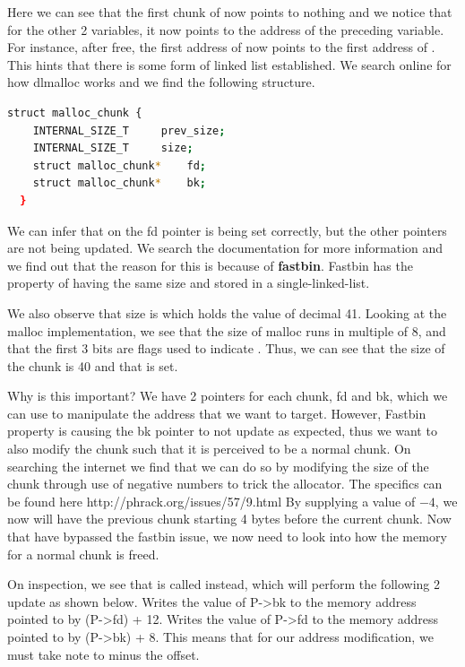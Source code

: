 Here we can see that the first chunk of  now points to nothing and we notice
that for the other 2 variables, it now points to the address of the preceding
variable. For instance, after free, the first address of  now points to
the first address of . This hints that there is some form of linked list
established. We search online for how dlmalloc works and we find the following
structure.

\begin{lstlisting}[language=bash]
  struct malloc_chunk {
    INTERNAL_SIZE_T		prev_size;
    INTERNAL_SIZE_T		size;
    struct malloc_chunk*	fd;
    struct malloc_chunk*	bk;
  }
\end{lstlisting}

We can infer that on  the fd pointer is being set correctly, but
the other pointers are not being updated. We search the documentation for more
information and we find out that the reason for this is because of \textbf{fastbin}.
Fastbin has the property of having the same size and stored in a single-linked-list.

We also observe that size is  which holds the value of decimal
41. Looking at the malloc implementation, we see that the size of malloc runs
in multiple of 8, and that the first 3 bits are flags used to indicate
. Thus, we can see that the
size of the chunk is 40 and that  is set.

Why is this important? We have 2 pointers for each chunk, fd and bk, which we
can use to manipulate the address that we want to target. However, Fastbin property
is causing the bk pointer to not update as expected, thus we want to also modify
the chunk such that it is perceived to be a normal chunk. On searching the internet
we find that we can do so by modifying the size of the chunk through use of negative
numbers to trick the allocator. The specifics can be found here http://phrack.org/issues/57/9.html
By supplying a value of $-4$, we now will have the previous chunk starting 4 bytes
before the current chunk. Now that have bypassed the fastbin issue, we now need
to look into how the memory for a normal chunk is freed.

On inspection, we see that  is called instead, which will perform the
following 2 update as shown below. 
Writes the value of P->bk to the memory address pointed to by (P->fd) + 12.
Writes the value of P->fd to the memory address pointed to by (P->bk) + 8.
This means that for our address modification, we must take
note to minus the offset.

